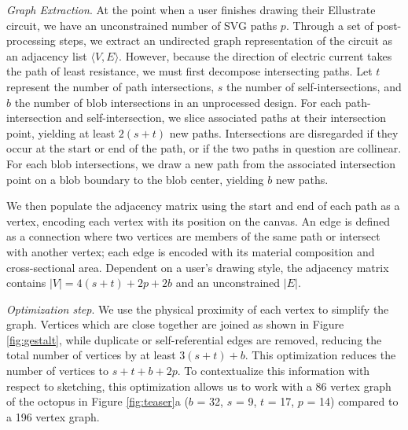 \documentclass{sigchi}
\begin{document}
      \textit{Graph Extraction}.
      At the point when a user finishes drawing their Ellustrate circuit, we have an unconstrained number of SVG paths $p$. 
      Through a set of post-processing steps, we extract an undirected graph representation of the circuit as an adjacency list $\langle V, E \rangle$. However, because the direction of electric current takes the path of least resistance, we must first decompose intersecting paths.
    Let $t$ represent the number of path intersections, $s$ the number of self-intersections, and $b$ the number of blob intersections in an unprocessed design. For each path-intersection and self-intersection, we slice associated paths at their intersection point, yielding at least $2(s + t)$ new paths. Intersections are disregarded if they occur at the start or end of the path, or if the two paths in question are collinear. For each blob intersections, we draw a new path from the associated intersection point on a blob boundary to the blob center, yielding $b$ new paths. 
    
    We then populate the adjacency matrix using the start and end of each path as a vertex, encoding each vertex with its position on the canvas. An edge is defined as a connection where two vertices are members of the same path or intersect with another vertex; each edge is encoded with its material composition and cross-sectional area.
     Dependent on  a user's drawing style, the adjacency matrix contains $|V| = 4(s + t) + 2p + 2b $ and an unconstrained $|E|$.
 
    \textit{Optimization step}. We use the physical proximity of each vertex to simplify the graph. Vertices which are close together are joined as shown in Figure \ref{fig:gestalt}, while duplicate or self-referential edges are removed, reducing the total number of vertices by at least $3(s + t) + b$. This optimization reduces the number of vertices to $s + t + b + 2p$. To contextualize this information with respect to sketching, this optimization allows us to work with a 86 vertex graph of the octopus in Figure \ref{fig:teaser}a ($b$ = 32, $s$ = 9, $t$ = 17, $p$ = 14) compared to a 196 vertex graph.
\end{document}
